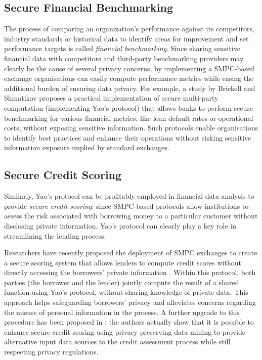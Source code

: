 \documentclass[12pt]{article}
\begin{document}
\subsection{Secure Financial Benchmarking}
The process of comparing an organization's performance against its competitors, industry standards or historical data to identify areas for improvement and set performance targets is called \textit{financial benchmarking}. Since sharing sensitive financial data with competitors and third-party benchmarking providers may clearly be the cause of several privacy concerns, by implementing a SMPC-based exchange organisations can easily compute performance metrics while easing the additional burden of ensuring data privacy.
For example, a study by Brickell and Shmatikov \cite{Publishing} proposes a practical implementation of secure multi-party computation (implementing Yao's protocol) that allows banks to perform secure benchmarking for various financial metrics, like loan default rates or operational costs, without exposing sensitive information. Such protocols enable organisations to identify best practices and enhance their operations without risking sensitive information exposure implied by standard exchanges.

\subsection{Secure Credit Scoring}

Similarly, Yao's protocol can be profitably employed in financial data analysis to provide \textit{secure credit scoring}: since SMPC-based protocols allow institutions to assess the risk associated with borrowing money to a particular customer without disclosing private information, Yao's protocol can clearly play a key role in streamlining the lending process.

Researchers have recently proposed the deployment of SMPC exchanges to create a secure scoring system that allows lenders to compute credit scores without directly accessing the borrowers' private information \cite{Scoring}. Within this protocol, both parties (the borrower and the lender) jointly compute the result of a shared function using Yao's protocol, without sharing knowledge of private data. This approach helps safeguarding borrowers' privacy and alleviates concerns regarding the misuse of personal information in the process. A further upgrade to this procedure has been proposed in \cite{ScoringMining}: the authors actually show that it is possible to enhance secure credit scoring using privacy-preserving data mining \cite{Mining} to provide alternative input data sources to the credit assessment process while still respecting privacy regulations.
\end{document}

